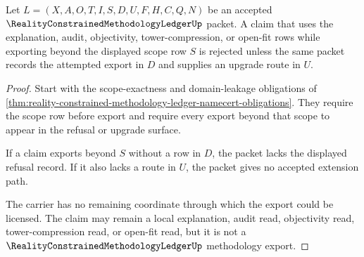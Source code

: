 \begin{theorem}
\label{thm:reality-constrained-methodology-ledger-domain-leakage-refusal}
Let $L=(X,A,O,T,I,S,D,U,F,H,C,Q,N)$ be an accepted $\RealityConstrainedMethodologyLedgerUp$ packet. A claim that uses the explanation, audit, objectivity, tower-compression, or open-fit rows while exporting beyond the displayed scope row $S$ is rejected unless the same packet records the attempted export in $D$ and supplies an upgrade route in $U$.
\end{theorem}
\begin{proof}
Start with the scope-exactness and domain-leakage obligations of \autoref{thm:reality-constrained-methodology-ledger-namecert-obligations}. They require the scope row before export and require every export beyond that scope to appear in the refusal or upgrade surface.

If a claim exports beyond $S$ without a row in $D$, the packet lacks the displayed refusal record. If it also lacks a route in $U$, the packet gives no accepted extension path.

The carrier has no remaining coordinate through which the export could be licensed. The claim may remain a local explanation, audit read, objectivity read, tower-compression read, or open-fit read, but it is not a $\RealityConstrainedMethodologyLedgerUp$ methodology export.
\end{proof}

